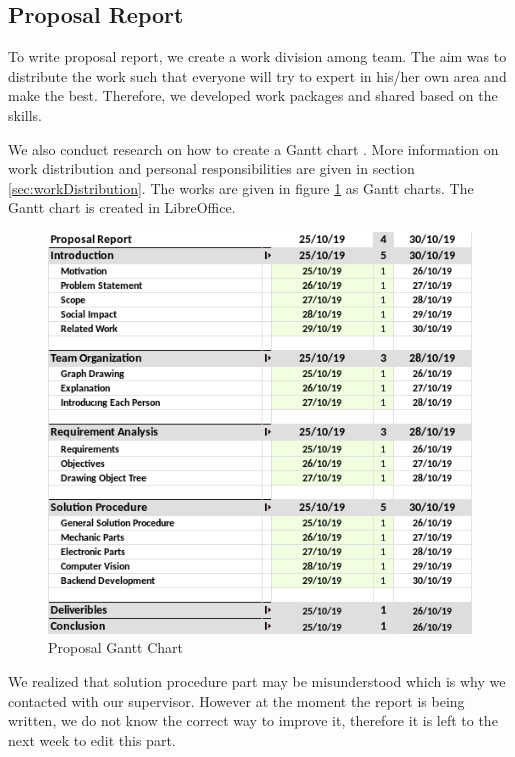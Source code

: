 \subsection{Proposal Report}
To write proposal report, we create a work division among team. The aim was to distribute the work such that everyone will try to expert in his/her own area and make the best. Therefore, we developed work packages and shared based on the skills.

We also conduct research on how to create a Gantt chart \cite{cite:ganttchart}.
More information on work distribution and personal responsibilities are given in section \ref{sec:workDistribution}. The works are given in figure \ref{fig:ganttChart} as Gantt charts. The Gantt chart is created in LibreOffice.

\begin{figure}
    \centering
    \includegraphics[width=\linewidth]{img/proposalGanttChart.png}
    \caption{Proposal Gantt Chart}
    \label{fig:ganttChart}
\end{figure}

We realized that solution procedure part may be misunderstood which is why we contacted with our supervisor. However at the moment the report is being written, we do not know the correct way to improve it, therefore it is left to the next week to edit this part.
